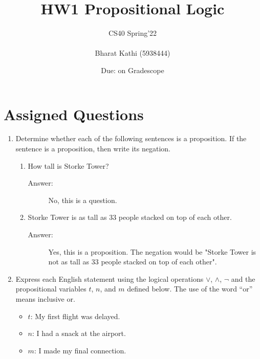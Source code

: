 \documentclass[12pt, oneside]{article}
\title{HW1 Propositional Logic}
\author{CS40 Spring'22\\\\
Bharat Kathi (5938444)}
\date{Due:  on Gradescope}
\begin{document}
\maketitle


\section*{Assigned Questions}
\begin{enumerate}
\item Determine whether each of the following sentences is a proposition. If the sentence is a proposition, then write its negation.
\begin{enumerate}
    \item How tall is Storke Tower?
    \begin{description}
        \item[Answer:] No, this is a question.
    \end{description}
    \item Storke Tower is as tall as 33 people stacked on top of each other.
    \begin{description}
        \item[Answer:] Yes, this is a proposition. The negation would be "Storke Tower is not as tall as 33 people stacked on top of each other".
    \end{description}
\end{enumerate}


\item Express each English statement using the logical operations $\lor$, $\land$, $\neg$ and the propositional variables $t$, $n$, and $m$ defined below. The use of the word ``or'' means inclusive or.
\begin{itemize}
    \item $t$: My first flight was delayed.
    \item $n$: I had a snack at the airport.
    \item $m$: I made my final connection.
\end{itemize}


\end{enumerate}
\end{document}
